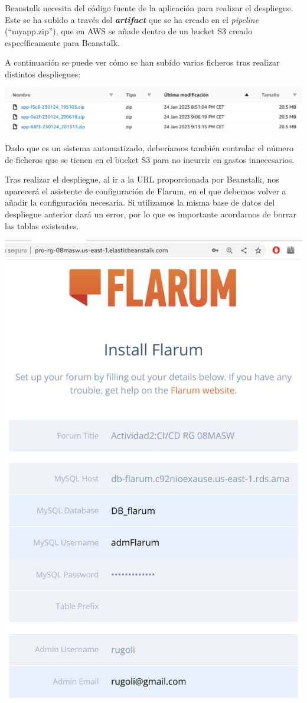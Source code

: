 \documentclass{\ClassPath/viu-tfm-template}
\begin{document}
Beanstalk necesita del código fuente de la aplicación para realizar el despliegue. Este se ha subido a través del \textbf{\textit{artifact}} que se ha creado en el \textit{pipeline} (“myapp.zip”), que en AWS se añade dentro de un bucket S3 creado específicamente para Beanstalk.

A continuación se puede ver cómo se han subido varios ficheros tras realizar distintos despliegues:
\begin{center}
    \includegraphics[frame,width=\linewidth]{img/s3.png}
\end{center}

Dado que es un sistema automatizado, deberíamos también controlar el número de ficheros que se tienen en el bucket S3 para no incurrir en gastos innecesarios.

Tras realizar el despliegue, al ir a la URL proporcionada por Beanstalk,  nos aparecerá el asistente de configuración de Flarum, en el que debemos volver a añadir la configuración necesaria. Si utilizamos la misma base de datos del despliegue anterior dará un error, por lo que es importante acordarnos de borrar las tablas existentes.

\begin{center}
    \includegraphics[frame,width=0.63\linewidth]{img/flarum-2.png}
\end{center}
\end{document}
